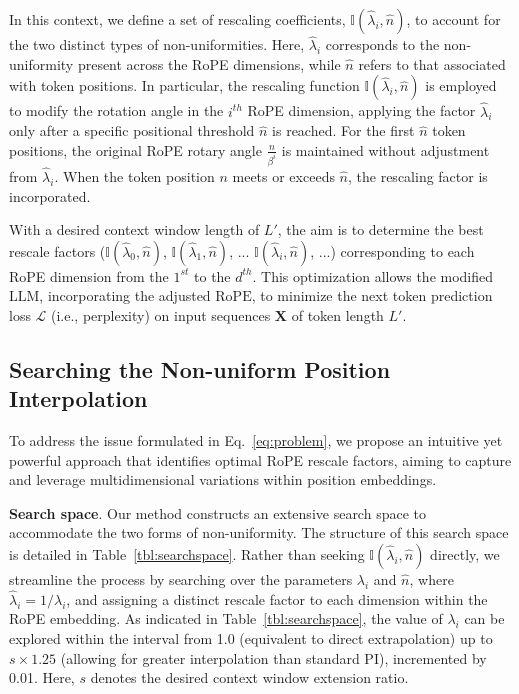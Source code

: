 In this context, we define a set of rescaling coefficients, $\mathbb{I}(\hat{\lambda}_{i},\hat{n})$, to account for the two distinct types of non-uniformities. Here, $\hat{\lambda}_i$ corresponds to the non-uniformity present across the RoPE dimensions, while $\hat{n}$ refers to that associated with token positions. In particular, the rescaling function $\mathbb{I}(\hat{\lambda}_{i},\hat{n})$ is employed to modify the rotation angle in the $i^{th}$ RoPE dimension, applying the factor $\hat{\lambda}_i$ only after a specific positional threshold $\hat{n}$ is reached. For the first $\hat{n}$ token positions, the original RoPE rotary angle $\frac{n}{\beta^i}$ is maintained without adjustment from $\hat{\lambda}_i$. When the token position $n$ meets or exceeds $\hat{n}$, the rescaling factor is incorporated.

With a desired context window length of $L'$, the aim is to determine the best rescale factors ($\mathbb{I}(\hat{\lambda}_{0},\hat{n})$, $\mathbb{I}(\hat{\lambda}_{1},\hat{n})$, ... $\mathbb{I}(\hat{\lambda}_{i},\hat{n})$, ...) corresponding to each RoPE dimension from the $1^{st}$ to the $d^{th}$. This optimization allows the modified $\text{LLM}$, incorporating the adjusted $\text{RoPE}$, to minimize the next token prediction loss $\mathcal{L}$ (i.e., perplexity) on input sequences $\mathbf{X}$ of token length $L'$.

\subsection{Searching the Non-uniform Position Interpolation}

To address the issue formulated in Eq.~\ref{eq:problem}, we propose an intuitive yet powerful approach that identifies optimal RoPE rescale factors, aiming to capture and leverage multidimensional variations within position embeddings.

\textbf{Search space}. Our method constructs an extensive search space to accommodate the two forms of non-uniformity. The structure of this search space is detailed in Table~\ref{tbl:searchspace}. Rather than seeking $\mathbb{I}(\hat{\lambda}_{i},\hat{n})$ directly, we streamline the process by searching over the parameters $\lambda_i$ and $\hat{n}$, where $\hat{\lambda}_{i}=1/\lambda_i$, and assigning a distinct rescale factor to each dimension within the RoPE embedding. As indicated in Table~\ref{tbl:searchspace}, the value of $\lambda_i$ can be explored within the interval from 1.0 (equivalent to direct extrapolation) up to $s\times1.25$ (allowing for greater interpolation than standard PI), incremented by 0.01. Here, $s$ denotes the desired context window extension ratio.


